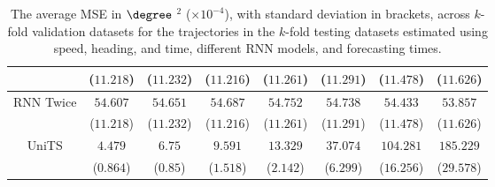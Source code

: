 \begin{table}[!ht]
{\begin{tabular}{|c|c|c|c|c|c|c|c|}
			 & ($11.218$) & ($11.232$) & ($11.216$) & ($11.261$) & ($11.291$) & ($11.478$) & ($11.626$) \\ \hline
			\multirow{2}{*}{RNN Twice} & $54.607$ & $54.651$ & $54.687$ & $54.752$ & $54.738$ & $54.433$ & $53.857$ \\
			 & ($11.218$) & ($11.232$) & ($11.216$) & ($11.261$) & ($11.291$) & ($11.478$) & ($11.626$) \\ \hline
			\multirow{2}{*}{UniTS} & $4.479$ & $6.75$ & $9.591$ & $13.329$ & $37.074$ & $104.281$ & $185.229$ \\
			 & ($0.864$) & ($0.85$) & ($1.518$) & ($2.142$) & ($6.299$) & ($16.256$) & ($29.578$) \\ \hline
		\end{tabular}
	}
	\caption{The average MSE in $\degree$ $^{2}$ ($\times 10^{-4}$), with standard deviation in brackets, across $k$-fold validation datasets for the trajectories in the $k$-fold testing datasets estimated using speed, heading, and time, different RNN models, and forecasting times.}
	\label{tab:all_speed_actual_dir_MSE}
\end{table}

